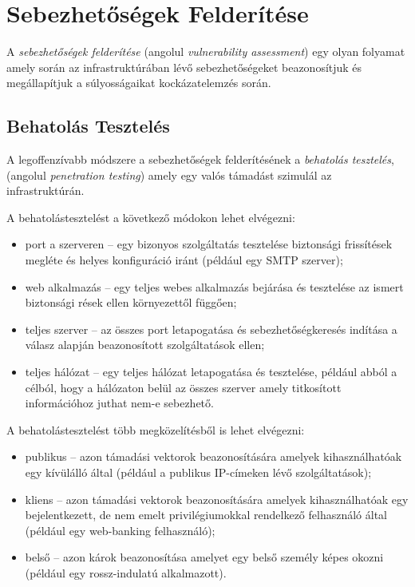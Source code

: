 \documentclass[a4paper,12pt]{article}
\begin{document}
\section{Sebezhetőségek Felderítése}
	
	A \textit{sebezhetőségek felderítése} (angolul \textit{vulnerability assessment}) egy olyan folyamat amely során az infrastruktúrában lévő sebezhetőségeket beazonosítjuk és megállapítjuk a súlyosságaikat kockázatelemzés során.
	
\subsection{Behatolás Tesztelés}
	
	A legoffenzívabb módszere a sebezhetőségek felderítésének a \textit{behatolás tesztelés}, (angolul \textit{penetration testing}) amely egy valós támadást szimulál az infrastruktúrán.
	
	\noindent A behatolástesztelést a következő módokon lehet elvégezni:
	
	\begin{itemize}
		\item port a szerveren -- egy bizonyos szolgáltatás tesztelése biztonsági frissítések megléte és helyes konfiguráció iránt (például egy SMTP szerver);
		\item web alkalmazás -- egy teljes webes alkalmazás bejárása és tesztelése az ismert biztonsági rések ellen környezettől függően;
		\item teljes szerver -- az összes port letapogatása és sebezhetőségkeresés indítása a válasz alapján beazonosított szolgáltatások ellen;
		\item teljes hálózat -- egy teljes hálózat letapogatása és tesztelése, például abból a célból, hogy a hálózaton belül az összes szerver amely titkosított információhoz juthat nem-e sebezhető.
	\end{itemize}
	
	\noindent A behatolástesztelést több megközelítésből is lehet elvégezni:
	
	\begin{itemize}
		\item publikus -- azon támadási vektorok beazonosítására amelyek kihasználhatóak egy kívülálló által (például a publikus IP-címeken lévő szolgáltatások);
		\item kliens -- azon támadási vektorok beazonosítására amelyek kihasználhatóak egy bejelentkezett, de nem emelt privilégiumokkal rendelkező felhasználó által (például egy web-banking felhasználó);
		\item belső -- azon károk beazonosítása amelyet egy belső személy képes okozni (például egy rossz-indulatú alkalmazott).
	\end{itemize}
\end{document}
